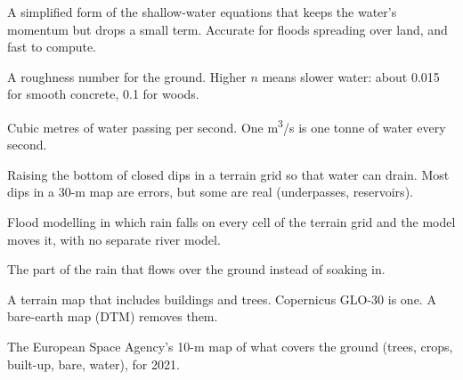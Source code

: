\begin{description}[leftmargin=3.2cm,style=nextline,itemsep=0.25em]
\item[Local-inertial equations] A simplified form of the shallow-water equations that keeps the water's momentum but
drops a small term. Accurate for floods spreading over land, and fast to compute.
\item[Manning's $n$] A roughness number for the ground. Higher $n$ means slower water: about 0.015 for smooth concrete,
0.1 for woods.
\item[m\textsuperscript{3}/s] Cubic metres of water passing per second. One m\textsuperscript{3}/s is one tonne of water
every second.
\item[Pit filling] Raising the bottom of closed dips in a terrain grid so that water can drain. Most dips in a 30-m map are
errors, but some are real (underpasses, reservoirs).
\item[Rain-on-grid] Flood modelling in which rain falls on every cell of the terrain grid and the model moves it, with no
separate river model.
\item[Runoff] The part of the rain that flows over the ground instead of soaking in.
\item[Surface model (DSM)] A terrain map that includes buildings and trees. Copernicus GLO-30 is one. A bare-earth map
(DTM) removes them.
\item[WorldCover] The European Space Agency's 10-m map of what covers the ground (trees, crops, built-up, bare, water),
for 2021.
\end{description}
\normalsize

